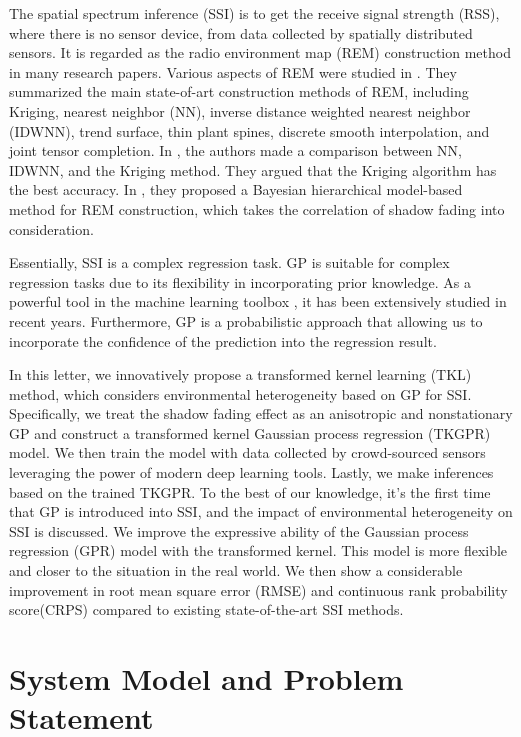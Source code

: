 \documentclass[journal, oneside, twocolumn]{IEEEtran}
\begin{document}
The spatial spectrum inference (SSI) is to get the receive signal strength (RSS), where there is no sensor device, from data collected by spatially distributed sensors. It is regarded as the radio environment map (REM) construction method in many research papers\cite{Phillips2012, Pesko2014, Sato2017, Li2018, Han2019, Katagiri2020, Xu2021}. Various aspects of REM were studied in \cite{Li2018}. They summarized the main state-of-art construction methods of REM, including Kriging, nearest neighbor (NN), inverse distance weighted nearest neighbor (IDWNN), trend surface, thin plant spines, discrete smooth interpolation, and joint tensor completion. In \cite{Han2019}, the authors made a comparison between NN, IDWNN, and the Kriging method. They argued that the Kriging algorithm has the best accuracy. In \cite{Xu2021}, they proposed a Bayesian hierarchical model-based method for REM construction, which takes the correlation of shadow fading into consideration. 

Essentially, SSI is a complex regression task. GP is suitable for complex regression tasks due to its flexibility in incorporating prior knowledge. As a powerful tool in the machine learning toolbox \cite{Rasmussen2006}, it has been extensively studied in recent years\cite{Damianou2013, Wilson2013, Duvenaud2014a, Salimbeni2017a, Lee2018, Wilson2019}.  Furthermore, GP is a probabilistic approach that allowing us to incorporate the confidence of the prediction into the regression result.

In this letter, we innovatively propose a transformed kernel learning (TKL) method, which considers environmental heterogeneity based on GP for SSI. Specifically, we treat the shadow fading effect as an anisotropic and nonstationary GP and construct a transformed kernel Gaussian process regression (TKGPR) model. We then train the model with data collected by crowd-sourced sensors leveraging the power of modern deep learning tools. Lastly, we make inferences based on the trained TKGPR. To the best of our knowledge, it's the first time that GP is introduced into SSI, and the impact of environmental heterogeneity on SSI is discussed. We improve the expressive ability of the Gaussian process regression (GPR) model with the transformed kernel. This model is more flexible and closer to the situation in the real world. We then show a considerable improvement in root mean square error (RMSE) and continuous rank probability score(CRPS)\cite{Gneiting2007} compared to existing state-of-the-art SSI methods.

\section{System Model and Problem Statement}
\end{document}
